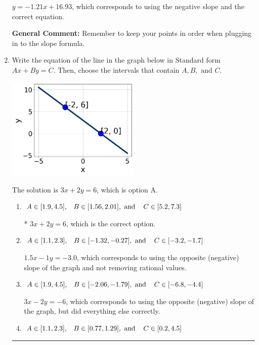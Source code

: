 \documentclass{extbook}[14pt]
\newcommand{\litem}[1]{\item #1

\rule{\textwidth}{0.4pt}}
\begin{document}
\begin{enumerate}
{\begin{enumerate}[label=\Alph*.]
 $y = -1.21x + 16.93$, which corresponds to using the negative slope and the correct equation.
\end{enumerate}

\textbf{General Comment:} Remember to keep your points in order when plugging in to the slope formula.
}
\litem{
Write the equation of the line in the graph below in Standard form $Ax+By=C$. Then, choose the intervals that contain $A, B, \text{ and } C$.

\begin{center}
    \includegraphics[width=0.5\textwidth]{../Figures/linearGraphToStandardCopyC.png}
\end{center}




The solution is \( 3x + 2y = 6 \), which is option A.\begin{enumerate}[label=\Alph*.]
\item \( A \in [1.9, 4.5], \hspace{3mm} B \in [1.56, 2.01], \text{ and } \hspace{3mm} C \in [5.2, 7.3] \)

* $3x + 2y = 6$, which is the correct option.
\item \( A \in [1.1, 2.3], \hspace{3mm} B \in [-1.32, -0.27], \text{ and } \hspace{3mm} C \in [-3.2, -1.7] \)

 $1.5x - 1y = -3.0$, which corresponds to using the opposite (negative) slope of the graph and not removing rational values.
\item \( A \in [1.9, 4.5], \hspace{3mm} B \in [-2.06, -1.79], \text{ and } \hspace{3mm} C \in [-6.8, -4.4] \)

 $3x - 2y = -6$, which corresponds to using the opposite (negative) slope of the graph, but did everything else correctly.
\item \( A \in [1.1, 2.3], \hspace{3mm} B \in [0.77, 1.29], \text{ and } \hspace{3mm} C \in [0.2, 4.5] \)


\end{enumerate}}
\end{enumerate}
\end{document}
